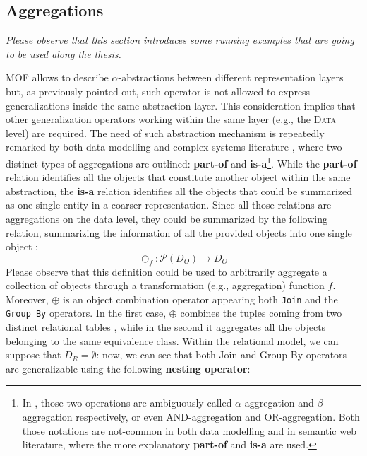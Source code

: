 \subsection{Aggregations}\label{sec:informationsintegration}
\textit{Please observe that this section introduces some running examples that are going to be used along the thesis.}

MOF allows to describe $\alpha$-abstractions between different representation layers but, as previously pointed out, such operator is not allowed to express generalizations inside the same abstraction layer. This consideration implies that other generalization operators working within the same layer (e.g., the \textsc{Data} level) are required. The need of such abstraction mechanism is repeatedly remarked by both data modelling  \cite{Pressman09,Larman04} and complex systems literature \cite{Johnson2011}, where two distinct types of aggregations are outlined: \textbf{part-of} and \textbf{is-a}\footnote{In \cite{Johnson2011}, those two operations are ambiguously called  $\alpha$-aggregation and $\beta$-aggregation respectively, or even AND-aggregation and OR-aggregation. Both those notations are not-common in both data modelling and in semantic web literature, where the more explanatory \textbf{part-of} and \textbf{is-a} are used.}. While the \textbf{part-of} relation identifies all the objects that constitute another object within the same abstraction, the \textbf{is-a} relation identifies all the objects that could be summarized as one single entity in a coarser representation. Since all those relations are aggregations on the data level, they could be summarized by the following relation, summarizing the information of all the provided objects into one single object \cite{BergamiMM16,BergamiMM17}:
\begin{equation}\label{eq:nestingAggregation}
\oplus_f\colon\mathcal{P}(D_O)\to D_O
\end{equation}
Please observe that this definition could be used to arbitrarily aggregate a collection of objects through a transformation (e.g., aggregation) function $f$. Moreover, $\oplus$ is an object combination operator appearing both \texttt{Join} and  the \texttt{Group By} operators. In the first case, $\oplus$  combines the tuples coming from two distinct relational tables \cite{BergamiMM16}, while in the second it aggregates all the objects belonging to the same equivalence class. Within the relational model, we can suppose that $D_R=\emptyset$: now, we can see that both Join and Group By operators are generalizable using the following \textbf{nesting operator}\index{$\nu$}:
